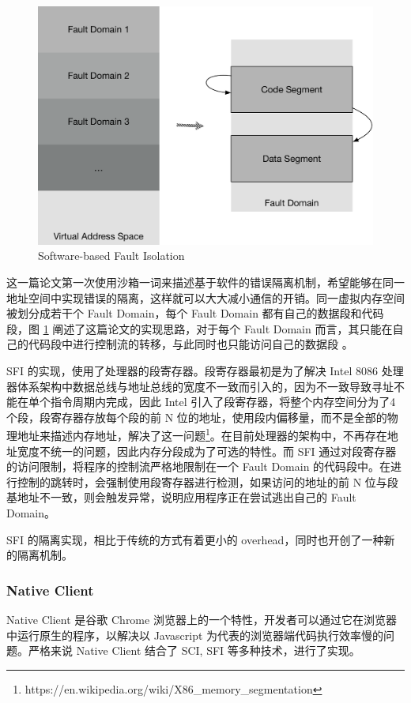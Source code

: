 \documentclass[final,12pt]{elsarticle}
\begin{document}
\begin{figure}
\centering
\includegraphics[width=0.8\linewidth]{imgs/sfi}
\caption{Software-based Fault Isolation}
\label{fig:sfi}
\end{figure}

这一篇论文第一次使用沙箱一词来描述基于软件的错误隔离机制，希望能够在同一地址空间中实现错误的隔离，这样就可以大大减小通信的开销。同一虚拟内存空间被划分成若干个 Fault Domain，每个 Fault Domain 都有自己的数据段和代码段，图 \ref{fig:sfi} 阐述了这篇论文的实现思路，对于每个 Fault Domain 而言，其只能在自己的代码段中进行控制流的转移，与此同时也只能访问自己的数据段 \cite{wahbe1994efficient}。

SFI 的实现，使用了处理器的段寄存器。段寄存器最初是为了解决 Intel 8086 处理器体系架构中数据总线与地址总线的宽度不一致而引入的，因为不一致导致寻址不能在单个指令周期内完成，因此 Intel 引入了段寄存器，将整个内存空间分为了4个段，段寄存器存放每个段的前 N 位的地址，使用段内偏移量，而不是全部的物理地址来描述内存地址，解决了这一问题\footnote{https://en.wikipedia.org/wiki/X86\_memory\_segmentation}。在目前处理器的架构中，不再存在地址宽度不统一的问题，因此内存分段成为了可选的特性。而 SFI 通过对段寄存器的访问限制，将程序的控制流严格地限制在一个 Fault Domain 的代码段中。在进行控制的跳转时，会强制使用段寄存器进行检测，如果访问的地址的前 N 位与段基地址不一致，则会触发异常，说明应用程序正在尝试逃出自己的 Fault Domain。

SFI 的隔离实现，相比于传统的方式有着更小的 overhead，同时也开创了一种新的隔离机制。

\subsubsection{Native Client}
\label{sss:nacl}

Native Client 是谷歌 Chrome 浏览器上的一个特性，开发者可以通过它在浏览器中运行原生的程序，以解决以 Javascript 为代表的浏览器端代码执行效率慢的问题。严格来说 Native Client 结合了 SCI, SFI 等多种技术，进行了实现。
\end{document}
